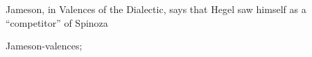 
\def\mytitle{DissertationText}
\def\myauthor{redlibrarian}
\def\baseheaderlevel2{}
\def\bibtextbibliography.bib{}
\def\latexfooterdiss-footer{}
\def\bibliostyleharvard{}
\def\authorsampopowich{}
\def\quoteslanguageenglish{}
\def\latexinputdiss-input{}


Jameson, in Valences of the Dialectic, says that Hegel saw himself as a “competitor” of Spinoza \citet{jameson-valences}

\begin{thebibliography}{0}

Jameson-valences;
\end{thebibliography}



